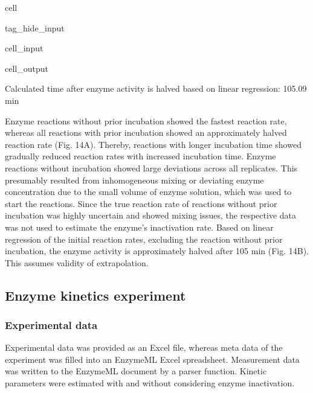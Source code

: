 \documentclass[letterpaper,12pt,english]{jupyterBook}
\begin{document}
\begin{sphinxuseclass}{cell}
\begin{sphinxuseclass}{tag_hide_input}
\begin{sphinxVerbatimInput}
\begin{sphinxuseclass}{cell_input}
\end{sphinxuseclass}\end{sphinxVerbatimInput}
\begin{sphinxVerbatimOutput}

\begin{sphinxuseclass}{cell_output}
\begin{sphinxVerbatim}[commandchars=\\\{\}]
Calculated time after enzyme activity is halved based on linear regression: 105.09 min
\end{sphinxVerbatim}

\noindent{}

\end{sphinxuseclass}\end{sphinxVerbatimOutput}

\end{sphinxuseclass}
\end{sphinxuseclass}
\sphinxAtStartPar
{}

\sphinxAtStartPar
Enzyme reactions without prior incubation showed the fastest reaction rate, whereas all reactions with prior incubation showed an approximately halved reaction rate (Fig. 14A). Thereby, reactions with longer incubation time showed gradually reduced reaction rates with increased incubation time. Enzyme reactions without incubation showed large deviations across all replicates. This presumably resulted from inhomogeneous mixing or deviating enzyme concentration due to the small volume of enzyme solution, which was used to start the reactions. Since the true reaction rate of reactions without prior incubation was highly uncertain and showed mixing issues, the respective data was not used to estimate the enzyme’s inactivation rate.
Based on linear regression of the initial reaction rates, excluding the reaction without prior incubation, the enzyme activity is approximately halved after 105 min (Fig. 14B). This assumes validity of extrapolation.


\subsection{Enzyme kinetics experiment}
\label{\detokenize{scenarios/enzyme_inactivation:enzyme-kinetics-experiment}}

\subsubsection{Experimental data}
\label{\detokenize{scenarios/enzyme_inactivation:id1}}
\sphinxAtStartPar
Experimental data was provided as an Excel file, whereas meta data of the experiment was filled into an EnzymeML Excel spreadsheet. Measurement data was written to the EnzymeML document by a parser function.
Kinetic parameters were estimated with and without considering enzyme inactivation.
\end{document}
